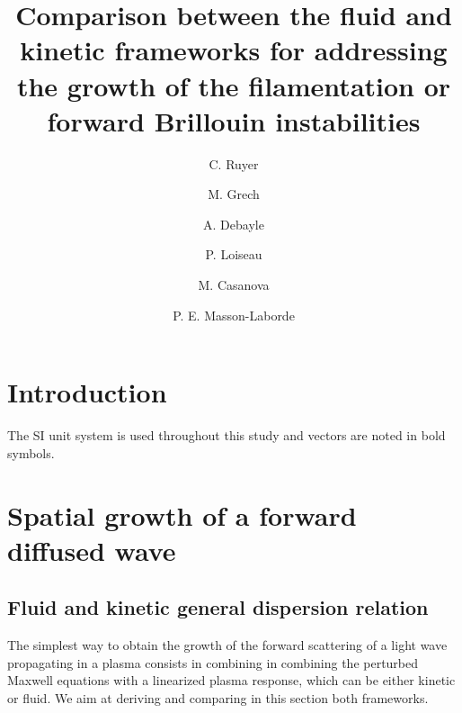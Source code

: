 \documentclass[
 reprint,
 amsmath,amssymb,
 aps,
]{revtex4-1}
\begin{document}
\title{Comparison between the fluid and kinetic frameworks for   addressing the growth of the filamentation or forward Brillouin instabilities}
\author{C. Ruyer}
\author{M. Grech}
\author{A. Debayle}
\author{P. Loiseau}
\author{M. Casanova}
\author{P. E. Masson-Laborde}

\begin{abstract}
 
\end{abstract}

\maketitle

\section{Introduction}
The SI unit system is used throughout this study and vectors are noted in bold symbols. 

\section{Spatial growth of a forward diffused wave}
\subsection{Fluid and kinetic general dispersion relation}
The simplest way to obtain the growth of the forward scattering of a light wave propagating in a plasma consists in combining in combining the perturbed Maxwell equations with a linearized plasma response, which can be either kinetic or fluid.
We aim at deriving and comparing in this section both frameworks.
\end{document}
